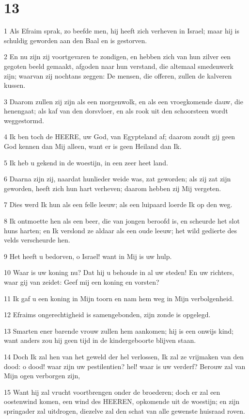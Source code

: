 \chapter{13}

\par 1 Als Efraim sprak, zo beefde men, hij heeft zich verheven in Israel; maar hij is schuldig geworden aan den Baal en is gestorven.
\par 2 En nu zijn zij voortgevaren te zondigen, en hebben zich van hun zilver een gegoten beeld gemaakt, afgoden naar hun verstand, die altemaal smedenwerk zijn; waarvan zij nochtans zeggen: De mensen, die offeren, zullen de kalveren kussen.
\par 3 Daarom zullen zij zijn als een morgenwolk, en als een vroegkomende dauw, die henengaat; als kaf van den dorsvloer, en als rook uit den schoorsteen wordt weggestormd.
\par 4 Ik ben toch de HEERE, uw God, van Egypteland af; daarom zoudt gij geen God kennen dan Mij alleen, want er is geen Heiland dan Ik.
\par 5 Ik heb u gekend in de woestijn, in een zeer heet land.
\par 6 Daarna zijn zij, naardat hunlieder weide was, zat geworden; als zij zat zijn geworden, heeft zich hun hart verheven; daarom hebben zij Mij vergeten.
\par 7 Dies werd Ik hun als een felle leeuw; als een luipaard loerde Ik op den weg.
\par 8 Ik ontmoette hen als een beer, die van jongen beroofd is, en scheurde het slot huns harten; en Ik verslond ze aldaar als een oude leeuw; het wild gedierte des velds verscheurde hen.
\par 9 Het heeft u bedorven, o Israel! want in Mij is uw hulp.
\par 10 Waar is uw koning nu? Dat hij u behoude in al uw steden! En uw richters, waar gij van zeidet: Geef mij een koning en vorsten?
\par 11 Ik gaf u een koning in Mijn toorn en nam hem weg in Mijn verbolgenheid.
\par 12 Efraims ongerechtigheid is samengebonden, zijn zonde is opgelegd.
\par 13 Smarten ener barende vrouw zullen hem aankomen; hij is een onwijs kind; want anders zou hij geen tijd in de kindergeboorte blijven staan.
\par 14 Doch Ik zal hen van het geweld der hel verlossen, Ik zal ze vrijmaken van den dood: o dood! waar zijn uw pestilentien? hel! waar is uw verderf? Berouw zal van Mijn ogen verborgen zijn,
\par 15 Want hij zal vrucht voortbrengen onder de broederen; doch er zal een oostenwind komen, een wind des HEEREN, opkomende uit de woestijn; en zijn springader zal uitdrogen, diezelve zal den schat van alle gewenste huisraad roven.

